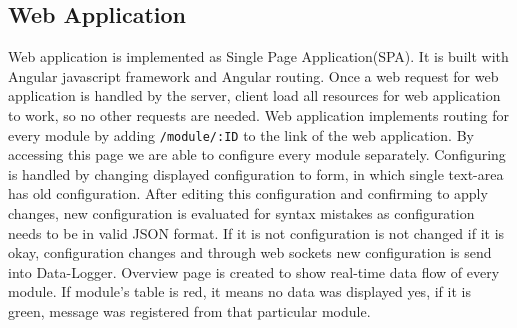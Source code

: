 \subsection{Web Application} %
\label{sub:web_application}
Web application is implemented as Single Page Application(SPA). It is built with Angular javascript framework and Angular routing. Once a web request for web application is handled by the server, client load all resources for web application to work, so no other requests are needed. Web application implements routing for every module by adding \verb|/module/:ID| to the link of the web application. By accessing this page we are able to configure every module separately. Configuring is handled by changing displayed configuration to form, in which single text-area has old configuration. After editing this configuration and confirming to apply changes, new configuration is evaluated for syntax mistakes as configuration needs to be in valid JSON format. If it is not configuration is not changed if it is okay, configuration changes and through web sockets new configuration is send into Data-Logger.
Overview page is created to show real-time data flow of every module. If module's table is red, it means no data was displayed yes, if it is green, message was registered from that particular module.
